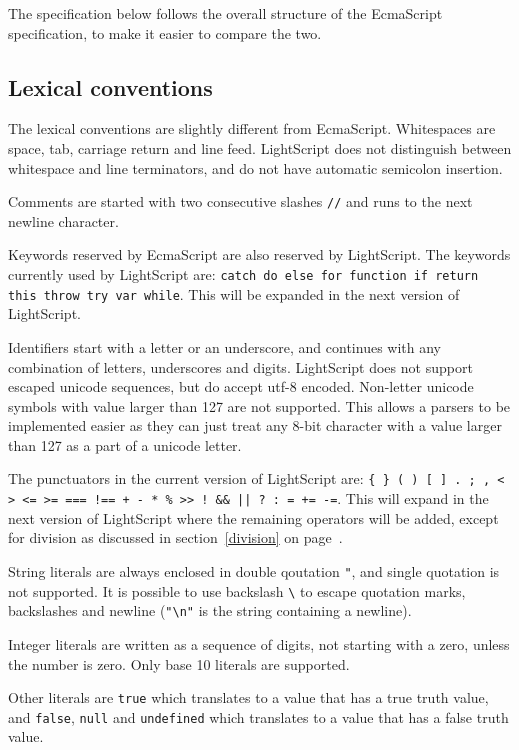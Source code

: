 \documentclass[11pt]{report}
\begin{document}
The specification below follows the overall structure of the EcmaScript specification, to make it easier to compare the two.


\subsection{Lexical conventions}
The lexical conventions are slightly different from EcmaScript. 
Whitespaces are space, tab, carriage return and line feed. 
LightScript does not distinguish between whitespace and line terminators, and do not have automatic semicolon insertion.

Comments are started with two consecutive slashes \verb|//| and runs to the next newline character.

Keywords reserved by EcmaScript are also reserved by LightScript. The keywords currently used by LightScript are: {\tt catch do else for function if return this throw try var while}. This will be expanded in the next version of LightScript.

Identifiers start with a letter or an underscore, and continues with any combination of letters, underscores and digits. 
LightScript does not support escaped unicode sequences, but do accept utf-8 encoded. Non-letter unicode symbols with value larger than 127 are not supported. This allows a parsers to be implemented easier as they can just treat any 8-bit character with a value larger than 127 as a part of a unicode letter.

The punctuators in the current version of LightScript are: {\tt \verb|{| \verb|}| ( ) [ ] . ; , < > <= >= === !== + - * \% >> ! \&\& || ? : = += -=}. 
This will expand in the next version of LightScript where the remaining operators will be added, except for division as discussed in section~\ref{division} on page~\pageref{division}.

String literals are always enclosed in double qoutation \verb|"|, and single quotation is not supported. It is possible to use backslash \verb|\| to escape quotation marks, backslashes and newline (\verb|"\n"| is the string containing a newline).

Integer literals are written as a sequence of digits, not starting with a zero, unless the number is zero. Only base 10 literals are supported.

Other literals are \verb|true| which translates to a value that has a true truth value, and \verb|false|, \verb|null| and \verb|undefined| which translates to a value that has a false truth value.
\end{document}
